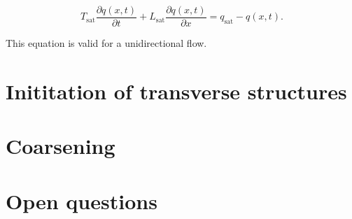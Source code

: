 \documentclass[12pt]{article}
\begin{document}
\begin{equation}
\label{equ:sed_flux}
T_{\text{sat}} \frac{\partial q(x,t)}{\partial t} + L_{\text{sat}} \frac{\partial q(x,t)}{\partial x} = q_{\text{sat}} - q(x,t) .
\end{equation}

This equation is valid for a unidirectional flow.
\section{Inititation of transverse structures}
\label{sec:init}

\section{Coarsening}
\label{sec:coarse}

\section{Open questions}
\label{sec:openQs}





\end{document}
